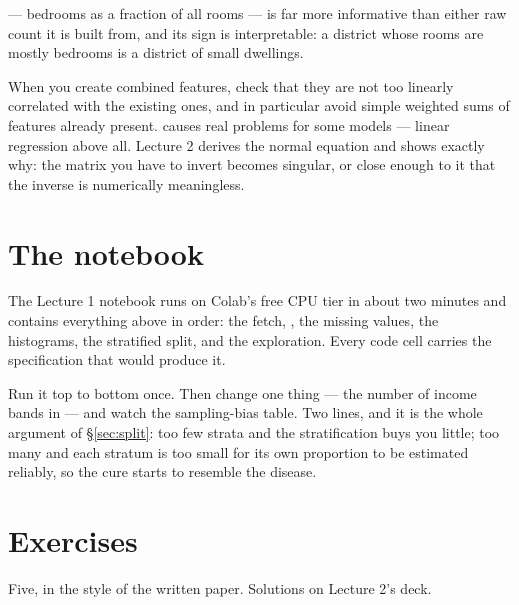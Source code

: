 \documentclass[11pt,a4paper]{article}
\begin{document}
 --- bedrooms as a fraction of all rooms --- is far more
informative than either raw count it is built from, and its sign is
interpretable: a district whose rooms are mostly bedrooms is a district of
small dwellings.

\begin{failbox}[title={A warning you will need next lecture}]
When you create combined features, check that they are not too linearly
correlated with the existing ones, and in particular avoid simple weighted sums
of features already present.  causes real problems for some
models --- linear regression above all. Lecture 2 derives the normal equation
and shows exactly why: the matrix you have to invert becomes singular, or close
enough to it that the inverse is numerically meaningless.
\end{failbox}

\section{The notebook}

The Lecture 1 notebook runs on Colab's free CPU tier in about two minutes and
contains everything above in order: the fetch, , the missing
values, the histograms, the stratified split, and the exploration. Every code
cell carries the specification that would produce it.

\begin{trybox}[title={What to change}]
Run it top to bottom once. Then change one thing --- the number of income bands
in  --- and watch the sampling-bias table. Two lines, and it is
the whole argument of \S\ref{sec:split}: too few strata and the stratification
buys you little; too many and each stratum is too small for its own proportion
to be estimated reliably, so the cure starts to resemble the disease.
\end{trybox}

\section{Exercises}

Five, in the style of the written paper. Solutions on Lecture 2's deck.
\end{document}
